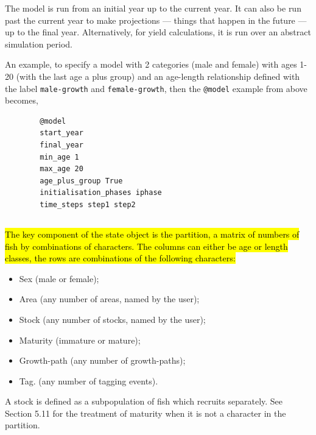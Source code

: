 The model is run from an initial year up to the current year. It can also be run past the current year to make projections — things that happen in the future — up to the final year. Alternatively, for yield calculations, it is run over an abstract simulation period.


An example, to specify a model with 2 categories (male and female) with ages 1-20 (with the last age a plus group) and an age-length relationship defined with the label \texttt{male-growth} and \texttt{female-growth}, then the \texttt{@model} example from above becomes,
{\small{\begin{verbatim}
		@model
		start_year
		final_year
		min_age 1
		max_age 20
		age_plus_group True
		initialisation_phases iphase
		time_steps step1 step2
		\end{verbatim}}}

\subsection{}

\hl{The key component of the state object is the partition, a matrix of numbers of fish by combinations of characters. The columns can either be age or length classes, the rows are combinations of the following characters:}


\begin{itemize}
\item Sex (male or female);
\item Area (any number of areas, named by the user);
\item Stock (any number of stocks, named by the user);
\item Maturity (immature or mature);
\item Growth-path (any number of growth-paths);
\item Tag. (any number of tagging events).
\end{itemize}

A stock is defined as a subpopulation of fish which recruits separately. See Section 5.11 for the treatment of maturity when it is not a character in the partition. 

